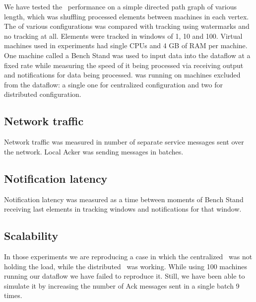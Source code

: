 \label {fs-acker-experiments}

We have tested the \tracker\ performance on a simple directed path graph of various length, which was shuffling processed elements between machines in each vertex. The \tracker of various configurations was compared with  tracking using watermarks and no tracking at all. Elements were tracked in windows of 1, 10 and 100.
Virtual machines used in experiments had single CPUs and 4 GB of RAM per machine. One machine called a Bench Stand was used to input data into the dataflow at a fixed rate while measuring the speed of it being processed via receiving output and notifications for data being processed. \tracker was running on machines excluded from the dataflow: a single one for centralized configuration and two for distributed configuration.

\subsection{Network traffic}

Network traffic was measured in number of separate service messages sent over the network. Local Acker was sending messages in batches.


\subsection{Notification latency}

Notification latency was measured as a time between moments of Bench Stand receiving last elements in tracking windows and notifications for that window.


\subsection{Scalability}

In those experiments we are reproducing a case in which the centralized \tracker\ was not holding the load, while the distributed \tracker\ was working. While using 100 machines running our dataflow we have failed to reproduce it. Still, we have been able to simulate it by increasing the number of Ack messages sent in a single batch 9 times.


